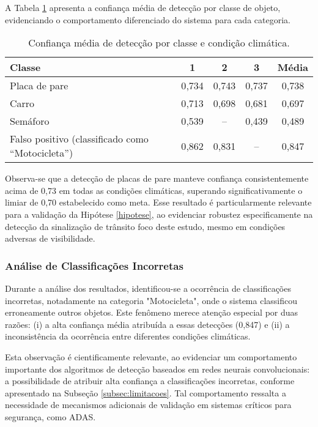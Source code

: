 A Tabela \ref{tab:desempenho_por_classe} apresenta a confiança média de detecção por classe de objeto, evidenciando o comportamento diferenciado do sistema para cada categoria.

\begin{table}[H]
\centering
\renewcommand{\arraystretch}{1.3}
\begin{tabular}{|l|c|c|c|c|}
\hline
\textbf{Classe} & \textbf{1} & \textbf{2} & \textbf{3} & \textbf{Média} \\
\hline
Placa de pare & 0{,}734 & 0{,}743 & 0{,}737 & 0{,}738 \\
\hline
Carro & 0{,}713 & 0{,}698 & 0{,}681 & 0{,}697 \\
\hline
Semáforo & 0{,}539 & -- & 0{,}439 & 0{,}489 \\
\hline
Falso positivo (classificado como ``Motocicleta'') & 0{,}862 & 0{,}831 & -- & 0{,}847 \\
\hline
\end{tabular}
\caption{Confiança média de detecção por classe e condição climática.}
\label{tab:desempenho_por_classe}
\end{table}


Observa-se que a detecção de placas de pare manteve confiança consistentemente acima de 0,73 em todas as condições climáticas, superando significativamente o limiar de 0,70 estabelecido como meta. Esse resultado é particularmente relevante para a validação da Hipótese \ref{hipotese}, ao evidenciar robustez especificamente na detecção da sinalização de trânsito foco deste estudo, mesmo em condições adversas de visibilidade.

\subsubsection{Análise de Classificações Incorretas}

Durante a análise dos resultados, identificou-se a ocorrência de classificações incorretas, notadamente na categoria "Motocicleta", onde o sistema classificou erroneamente outros objetos. Este fenômeno merece atenção especial por duas razões: (i) a alta confiança média atribuída a essas detecções (0,847) e (ii) a inconsistência da ocorrência entre diferentes condições climáticas.

Esta observação é cientificamente relevante, ao evidenciar um comportamento importante dos algoritmos de detecção baseados em redes neurais convolucionais: a possibilidade de atribuir alta confiança a classificações incorretas, conforme apresentado na Subseção \ref{subsec:limitacoes}. Tal comportamento ressalta a necessidade de mecanismos adicionais de validação em sistemas críticos para segurança, como ADAS.

